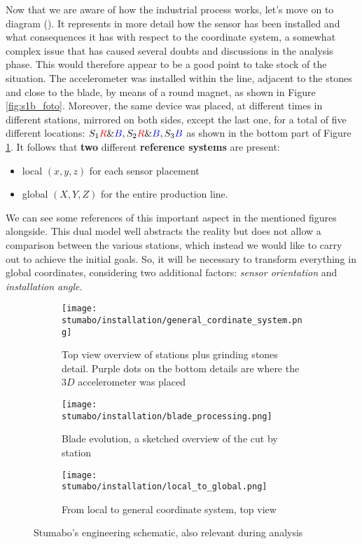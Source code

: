 Now that we are aware of how the industrial process works, let's move on to diagram ().
It represents in more detail how the sensor has been installed and what consequences it has with respect to the coordinate system, 
a somewhat complex issue that has caused several doubts and discussions in the analysis phase. This would therefore appear to be a good point to take stock of the situation.
The accelerometer was installed within the line, adjacent to the stones and close to the blade, by means of a round magnet, as shown in Figure \ref{fig:s1b_foto}.
Moreover, the same device was placed, at different times in different stations, mirrored on both sides, except the last one, for a total of five different locations: 
${S_{1}\textcolor{red}{R}\&\textcolor{blue}{B}, S_{2}\textcolor{red}{R}\&\textcolor{blue}{B}, S_{3}\textcolor{blue}{B}}$ as shown in the bottom part of Figure \ref{fig:top_view_line}.
It follows that \textbf{two} different \textbf{reference systems} are present:
\begin{itemize}\label{item:double_system}
    \item local $(x,y,z)$ for each sensor placement
    \item global $(X,Y,Z)$ for the entire production line.
\end{itemize}
We can see some references of this important aspect in the mentioned figures alongside. %
This dual model well abstracts the reality but does not allow a comparison between the various stations, which instead we would like to carry out to achieve the initial goals.
So, it will be necessary to transform everything in global coordinates, considering two additional factors:
 \textit{sensor orientation} and 
 \textit{installation angle}. 
\begin{figure}[!htp]
    \begin{subfigure}{\textwidth}
        \texttt{[image: stumabo/installation/general\_cordinate\_system.png]}
        \caption{Top view overview of stations plus grinding stones detail.
            Purple dots on the bottom details are where the $3D$ accelerometer was placed}
        \label{fig:top_view_line}
    \end{subfigure}
    \begin{subfigure}{\textwidth}
        \texttt{[image: stumabo/installation/blade\_processing.png]}
        \caption{Blade evolution, a sketched overview of the cut by station}
        \label{fig:blade_evolution}
    \end{subfigure}
    \begin{subfigure}{\textwidth}
        \texttt{[image: stumabo/installation/local\_to\_global.png]}
        \caption{From local to general coordinate system, top view}
        \label{fig:local_to_global}
    \end{subfigure}
    \caption{Stumabo's engineering schematic, also relevant during analysis}
    \label{fig:engineering_files}
\end{figure}

